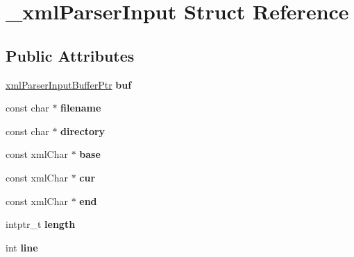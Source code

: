 \hypertarget{struct__xmlParserInput}{
\section{\_\-xmlParserInput Struct Reference}
\label{struct__xmlParserInput}
}
\subsection*{Public Attributes}
\begin{DoxyCompactItemize}
\item 
\hypertarget{struct__xmlParserInput_ab50ed3b4b2f13d9c298d901395dfa531}{
\hyperlink{struct__xmlParserInputBuffer}{xmlParserInputBufferPtr} {\bfseries buf}}
\label{struct__xmlParserInput_ab50ed3b4b2f13d9c298d901395dfa531}

\item 
\hypertarget{struct__xmlParserInput_a3536fa06529d1a11fdc4458b00d2680c}{
const char $\ast$ {\bfseries filename}}
\label{struct__xmlParserInput_a3536fa06529d1a11fdc4458b00d2680c}

\item 
\hypertarget{struct__xmlParserInput_adaf128e5827e8a2851f8c2247983affc}{
const char $\ast$ {\bfseries directory}}
\label{struct__xmlParserInput_adaf128e5827e8a2851f8c2247983affc}

\item 
\hypertarget{struct__xmlParserInput_ab2b245c3945ad6ad057f6a625350d282}{
const xmlChar $\ast$ {\bfseries base}}
\label{struct__xmlParserInput_ab2b245c3945ad6ad057f6a625350d282}

\item 
\hypertarget{struct__xmlParserInput_afc89c81a4d16f75444fb03a77b03df65}{
const xmlChar $\ast$ {\bfseries cur}}
\label{struct__xmlParserInput_afc89c81a4d16f75444fb03a77b03df65}

\item 
\hypertarget{struct__xmlParserInput_ab1cd43c8dae0a799db05df0c07c51030}{
const xmlChar $\ast$ {\bfseries end}}
\label{struct__xmlParserInput_ab1cd43c8dae0a799db05df0c07c51030}

\item 
\hypertarget{struct__xmlParserInput_a749778babdb3da7187cbd32a488ea500}{
intptr\_\-t {\bfseries length}}
\label{struct__xmlParserInput_a749778babdb3da7187cbd32a488ea500}

\item 
\hypertarget{struct__xmlParserInput_a52689e7ee99ea4f70fea0da521371d43}{
int {\bfseries line}}
\label{struct__xmlParserInput_a52689e7ee99ea4f70fea0da521371d43}


\end{DoxyCompactItemize}
